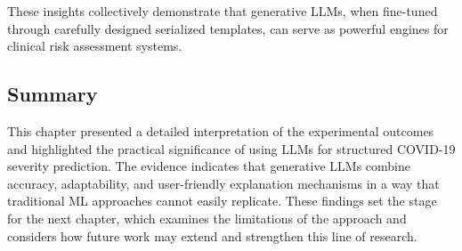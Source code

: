 These insights collectively demonstrate that generative LLMs, when fine-tuned through carefully designed serialized templates, can serve as powerful engines for clinical risk assessment systems.

\subsection{Summary}
This chapter presented a detailed interpretation of the experimental outcomes and highlighted the practical significance of using LLMs for structured COVID-19 severity prediction. The evidence indicates that generative LLMs combine accuracy, adaptability, and user-friendly explanation mechanisms in a way that traditional ML approaches cannot easily replicate. These findings set the stage for the next chapter, which examines the limitations of the approach and considers how future work may extend and strengthen this line of research.
